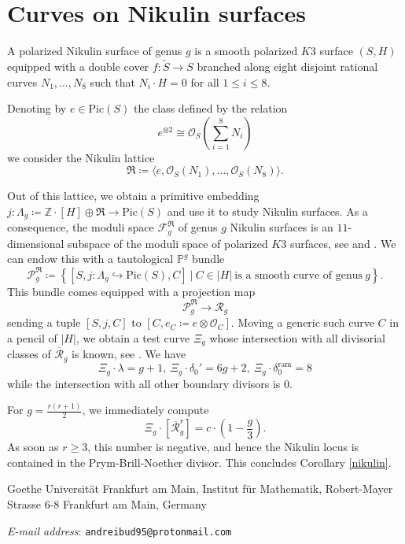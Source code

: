 \documentclass{article}
\makeatletter
\newcommand{\Addresses}{{%
		\bigskip
		\footnotesize
		
		Goethe Universit\"at Frankfurt am Main, Institut f\"ur Mathematik, Robert-Mayer Strasse 6-8
		\hfill \newline\texttt{}
		\indent 60325 Frankfurt am Main, Germany} 
	\par\nopagebreak
	\textit{E-mail address}: \texttt{andreibud95@protonmail.com}
}
\theoremstyle{plain}
\theoremstyle{definition}
\def\OO{\mathcal{O}}
\def\cR{\mathcal{R}}
\def\rr{\overline{\mathcal{R}}}
\makeatother
\begin{document}
\section{Curves on Nikulin surfaces}

A polarized Nikulin surface of genus $g$ is a smooth polarized $K3$ surface $(S, H)$ equipped with a double cover $f\colon \widetilde{S} \rightarrow S$ branched along eight disjoint rational curves $N_1, \ldots, N_8$ such that $N_i\cdot H = 0$ for all $1\leq i \leq 8$. 

Denoting by $e \in \textrm{Pic}(S)$ the class defined by the relation 
\[ e^{\otimes 2} \cong \OO_S(\sum_{i = 1}^8 N_i)\]
we consider the Nikulin lattice 
\[ \mathfrak{R} \coloneqq \langle e, \OO_S(N_1), \ldots, \OO_S(N_8)\rangle.\]

Out of this lattice, we obtain a primitive embedding $j\colon \Lambda_g \coloneqq \mathbb{Z}\cdot[H] \oplus \mathfrak{R} \rightarrow \textrm{Pic}(S)$ and use it to study Nikulin surfaces. As a consequence, the moduli space $\mathcal{F}^{\mathfrak{R}}_g$ of genus $g$ Nikulin surfaces is an $11$-dimensional subspace of the moduli space of polarized $K3$ surfaces, see \cite{Dolgachev-Nikulin} and \cite{Nikulin}. We can endow this with a tautological $\mathbb{P}^g$ bundle 
\[\mathcal{P}^{\mathfrak{R}}_g \coloneqq \left\{ [S,j\colon \Lambda_g\hookrightarrow \textrm{Pic}(S), C] \ | \ C \in |H| \ \textrm{is a smooth curve of genus} \ g \right\}. \]
This bundle comes equipped with a projection map
\[ \mathcal{P}^{\mathfrak{R}}_g \rightarrow \cR_g \]
sending a tuple $[S,j,C]$ to $[C, e_C \coloneqq e\otimes \OO_C]$. Moving a generic such curve $C$ in a pencil of $|H|$, we obtain a test curve $\Xi_g$ whose intersection with all divisorial classes of $\rr_g$ is known, see \cite[Proposition 1.4]{FarVerNikulintheta}. We have 
\[ \Xi_g\cdot \lambda = g+1, \ \Xi_g\cdot \delta_0'=6g+2, \ \Xi_g\cdot \delta_0^{\textrm{ram}} = 8 \]
while the intersection with all other boundary divisors is $0$. 

For $g = \frac{r(r+1)}{2}$, we immediately compute  
\[ \Xi_g \cdot [\rr^r_g] = c\cdot (1-\frac{g}{3}). \]
As soon as $r \geq 3$, this number is negative, and hence the Nikulin locus is contained in the Prym-Brill-Noether divisor. This concludes Corollary \ref{nikulin}.


\Addresses
\end{document}
